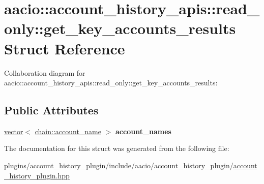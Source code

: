 \hypertarget{structaacio_1_1account__history__apis_1_1read__only_1_1get__key__accounts__results}{}\section{aacio\+:\+:account\+\_\+history\+\_\+apis\+:\+:read\+\_\+only\+:\+:get\+\_\+key\+\_\+accounts\+\_\+results Struct Reference}
\label{structaacio_1_1account__history__apis_1_1read__only_1_1get__key__accounts__results}


Collaboration diagram for aacio\+:\+:account\+\_\+history\+\_\+apis\+:\+:read\+\_\+only\+:\+:get\+\_\+key\+\_\+accounts\+\_\+results\+:
\subsection*{Public Attributes}
\begin{DoxyCompactItemize}
\item 
\mbox{\label{structaacio_1_1account__history__apis_1_1read__only_1_1get__key__accounts__results_a742b88b49ab35ed083de83017ba72af7}} 
\mbox{\hyperlink{classstd_1_1vector}{vector}}$<$ \mbox{\hyperlink{structaacio_1_1chain_1_1name}{chain\+::account\+\_\+name}} $>$ {\bfseries account\+\_\+names}
\end{DoxyCompactItemize}


The documentation for this struct was generated from the following file\+:\begin{DoxyCompactItemize}
\item 
plugins/account\+\_\+history\+\_\+plugin/include/aacio/account\+\_\+history\+\_\+plugin/\mbox{\hyperlink{account__history__plugin_8hpp}{account\+\_\+history\+\_\+plugin.\+hpp}}\end{DoxyCompactItemize}
